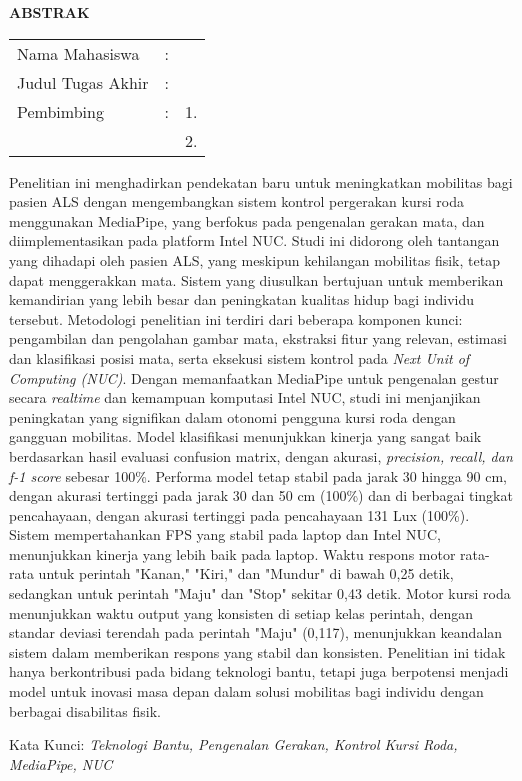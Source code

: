 \begin{center}
  \large\textbf{ABSTRAK}
\end{center}


\vspace{2ex}

\begingroup
\setlength{\tabcolsep}{0pt}

\noindent
\begin{tabularx}{\textwidth}{l >{\centering}m{2em} X}
  Nama Mahasiswa    & : & \name{}         \\

  Judul Tugas Akhir & : & \tatitle{}      \\

  Pembimbing        & : & 1. \advisor{}   \\
                    &   & 2. \coadvisor{} \\
\end{tabularx}
\endgroup

Penelitian ini menghadirkan pendekatan baru untuk meningkatkan mobilitas bagi pasien ALS dengan mengembangkan sistem kontrol pergerakan kursi roda menggunakan MediaPipe, yang berfokus pada pengenalan gerakan mata, dan diimplementasikan pada platform Intel NUC. Studi ini didorong oleh tantangan yang dihadapi oleh pasien ALS, yang meskipun kehilangan mobilitas fisik, tetap dapat menggerakkan mata. Sistem yang diusulkan bertujuan untuk memberikan kemandirian yang lebih besar dan peningkatan kualitas hidup bagi individu tersebut. Metodologi penelitian ini terdiri dari beberapa komponen kunci: pengambilan dan pengolahan gambar mata, ekstraksi fitur yang relevan, estimasi dan klasifikasi posisi mata, serta eksekusi sistem kontrol pada \textit{Next Unit of Computing (NUC)}. Dengan memanfaatkan MediaPipe untuk pengenalan gestur secara \emph{realtime} dan kemampuan komputasi Intel NUC, studi ini menjanjikan peningkatan yang signifikan dalam otonomi pengguna kursi roda dengan gangguan mobilitas.  Model klasifikasi menunjukkan kinerja yang sangat baik berdasarkan hasil evaluasi confusion matrix, dengan akurasi, \emph{precision, recall, dan f-1 score} sebesar 100\%. Performa model tetap stabil pada jarak 30 hingga 90 cm, dengan akurasi tertinggi pada jarak 30 dan 50 cm (100\%) dan di berbagai tingkat pencahayaan, dengan akurasi tertinggi pada pencahayaan 131 Lux (100\%). Sistem mempertahankan FPS yang stabil pada laptop dan Intel NUC, menunjukkan kinerja yang lebih baik pada laptop. Waktu respons motor rata-rata untuk perintah "Kanan," "Kiri," dan "Mundur" di bawah 0,25 detik, sedangkan untuk perintah "Maju" dan "Stop" sekitar 0,43 detik. Motor kursi roda menunjukkan waktu output yang konsisten di setiap kelas perintah, dengan standar deviasi terendah pada perintah "Maju" (0,117), menunjukkan keandalan sistem dalam memberikan respons yang stabil dan konsisten. Penelitian ini tidak hanya berkontribusi pada bidang teknologi bantu, tetapi juga berpotensi menjadi model untuk inovasi masa depan dalam solusi mobilitas bagi individu dengan berbagai disabilitas fisik.

Kata Kunci: \emph{Teknologi Bantu, Pengenalan Gerakan, Kontrol Kursi Roda, MediaPipe, NUC}